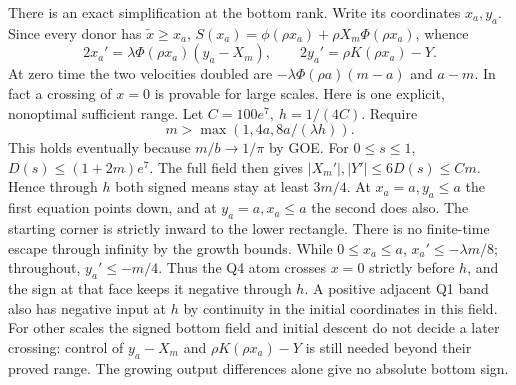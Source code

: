 \documentclass[11pt]{article}
\begin{document}
There is an exact simplification at the bottom rank. Write its
coordinates \(x_a,y_a\). Since every donor has \(\tilde x\ge x_a\),
\(S(x_a)=\phi(\rho x_a)+\rho X_m\Phi(\rho x_a)\), whence
\begin{equation}
 2x_a'=\lambda\Phi(\rho x_a)(y_a-X_m),\qquad
 2y_a'=\rho K(\rho x_a)-Y.
 \label{an04impv1:bottomfield}
\end{equation}
At zero time the two velocities doubled are
\(-\lambda\Phi(\rho a)(m-a)\) and \(a-m\). In fact a crossing
of \(x=0\) is provable for large scales. Here is one explicit,
nonoptimal sufficient range. Let \(C=100e^7,\ h=1/(4C)\). Require
\[
 m>\max(1,4a,8a/(\lambda h)).
\]
This holds eventually because \(m/b\to1/\pi\) by GOE. For
\(0\le s\le1\), \(D(s)\le(1+2m)e^7\). The full field then gives
\(|X_m'|,|Y'|\le6D(s)\le Cm\). Hence through \(h\) both signed
means stay at least \(3m/4\). At \(x_a=a,y_a\le a\) the first
equation points down, and at \(y_a=a,x_a\le a\) the second does
also. The starting corner is strictly inward to the lower rectangle.
There is no finite-time escape through infinity by the growth bounds.
While \(0\le x_a\le a\), \(x_a'\le-\lambda m/8\);
throughout, \(y_a'\le-m/4\). Thus the Q4 atom crosses \(x=0\)
strictly before \(h\), and the sign at that face keeps it negative
through \(h\). A positive adjacent Q1 band also has negative input
at \(h\) by continuity in the initial coordinates in this field.
For other scales the signed bottom field and initial descent do
not decide a later crossing: control of \(y_a-X_m\) and
\(\rho K(\rho x_a)-Y\) is still needed beyond their proved range.
The growing output differences alone give no absolute bottom sign.
\end{document}
